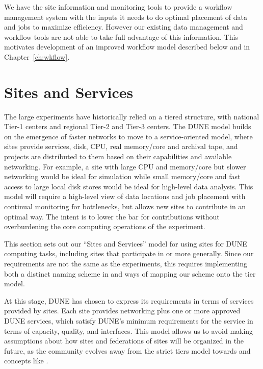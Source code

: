 \documentclass[../main-v1.tex]{subfiles}
\begin{document}
{We have the site information and monitoring tools to provide a workflow management system with the inputs it needs to do optimal placement of data and jobs to maximize efficiency. However our existing data management and workflow tools are not able to take full advantage of this information.  This motivates development of an improved workflow model described below and in Chapter~\ref{ch:wkflow}.



\section{Sites and Services }
\label{sec:cm:sites_and_services}  %


The large  experiments have historically relied on a tiered structure, with national Tier-1 centers %
and regional Tier-2 and Tier-3 centers.  The DUNE model builds on the emergence of faster networks to move to  a service-oriented model, where sites provide services, disk, CPU, real memory/core and archival tape, and projects are  distributed to them based on their capabilities and available networking.  For example, a site with large CPU and memory/core but slower networking would be ideal for simulation while small memory/core and fast access to large local disk stores would be ideal for high-level data analysis.  This model will require a high-level view of data locations and job placement with continual monitoring for bottlenecks, but allows new sites to contribute in an optimal way. The intent is to lower the bar for contributions without overburdening the core computing operations of the experiment.

This section sets out our ``Sites and Services'' model for using sites for DUNE computing tasks, including sites that participate in  or  more generally. Since our requirements are not the same as the  experiments, this %
requires implementing both a distinct naming scheme in
 and ways of mapping our scheme onto the  tier model.

At this stage, DUNE has chosen to express its requirements in terms of services provided by sites. Each site provides networking plus one or more approved DUNE services, which satisfy DUNE's minimum requirements for the service in terms of capacity, quality, and interfaces. This model allows us to avoid making assumptions about how sites and federations of sites will be organized in the future, as the community evolves away from the strict  tiers model towards  and concepts like %
.

}
\end{document}

